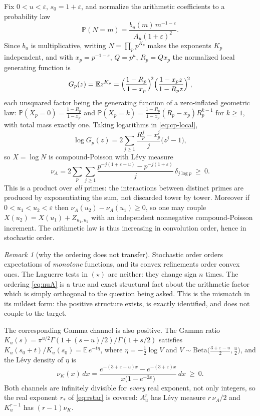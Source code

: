 \documentclass[11pt]{amsart}
\theoremstyle{definition}
\theoremstyle{remark}
\newtheorem{remark}[theorem]{Remark}
\theoremstyle{definition}
\newcommand{\eps}{\varepsilon}
\begin{document}
Fix $0<u<\eps$, $s_0=1+\eps$, and normalize the arithmetic coefficients to a probability law
\begin{equation}\label{eq:cp-law}
   \mathbb P(N=m)=\frac{b_u(m)\,m^{-1-\eps}}{A_u(1+\eps)^2} .
\end{equation}
Since $b_u$ is multiplicative, writing $N=\prod_pp^{K_p}$ makes the exponents $K_p$ independent,
and with $x_p=p^{-1-\eps}$, $Q=p^u$, $R_p=Qx_p$ the normalized local generating function is
\begin{equation}\label{eq:cp-local}
   G_p(z)=\mathbb Ez^{K_p}
   =\Bigl(\frac{1-R_p}{1-x_p}\Bigr)^{\!2}\Bigl(\frac{1-x_pz}{1-R_pz}\Bigr)^{\!2},
\end{equation}
each unsquared factor being the generating function of a zero-inflated geometric law:
$\mathbb P(X_p=0)=\tfrac{1-R_p}{1-x_p}$ and
$\mathbb P(X_p=k)=\tfrac{1-R_p}{1-x_p}(R_p-x_p)R_p^{k-1}$ for $k\ge1$, with total mass exactly one. Taking
logarithms in \eqref{eq:cp-local},
\begin{equation}\label{eq:cp-levy}
   \log G_p(z)=2\sum_{j\ge1}\frac{R_p^j-x_p^j}{j}\bigl(z^j-1\bigr),
\end{equation}
so $X=\log N$ is compound-Poisson with L\'evy measure
\begin{equation}\label{eq:nuA}
   \nu_A=2\sum_p\sum_{j\ge1}
   \frac{p^{-j(1+\eps-u)}-p^{-j(1+\eps)}}{j}\,\delta_{j\log p}\ \ge\ 0 .
\end{equation}
This is a product over \emph{all} primes: the interactions between distinct primes are produced
by exponentiating the sum, not discarded tower by tower. Moreover if $0<u_1<u_2<\eps$ then
$\nu_A(u_2)-\nu_A(u_1)\ge0$, so one may couple
$X(u_2)=X(u_1)+Z_{u_1,u_2}$ with an independent nonnegative compound-Poisson increment. The
arithmetic law is thus increasing in convolution order, hence in stochastic order.

\begin{remark}[why the ordering does not transfer]\label{rmk:order}
Stochastic order orders expectations of \emph{monotone} functions, and its convex refinements
order convex ones. The Laguerre tests in $(\star)$ are neither: they change sign $n$ times. The
ordering \eqref{eq:nuA} is a true and exact structural fact about the arithmetic factor which is
simply orthogonal to the question being asked. This is the mismatch in its mildest form: the
positive structure exists, is exactly identified, and does not couple to the target.
\end{remark}

The corresponding Gamma channel is also positive. The Gamma ratio
$K_u(s)=\pi^{u/2}\Gamma(1+(s-u)/2)/\Gamma(1+s/2)$ satisfies
$K_u(s_0+t)/K_u(s_0)=\mathbb E\,e^{-t\eta}$, where $\eta=-\tfrac12\log V$ and
$V\sim\mathrm{Beta}\bigl(\tfrac{3+\eps-u}{2},\tfrac u2\bigr)$, and the L\'evy density of $\eta$ is
\begin{equation}\label{eq:nuK}
   \nu_K(x)\,dx=\frac{e^{-(3+\eps-u)x}-e^{-(3+\eps)x}}{x\bigl(1-e^{-2x}\bigr)}\,dx\ \ge\ 0 .
\end{equation}
Both channels are infinitely divisible for \emph{every} real exponent, not only integers, so
the real exponent $r_*$ of \eqref{eq:rstar} is covered:
$A_u^r$ has L\'evy measure $r\,\nu_A/2$ and $K_u^{r-1}$ has $(r-1)\nu_K$.
\end{document}
